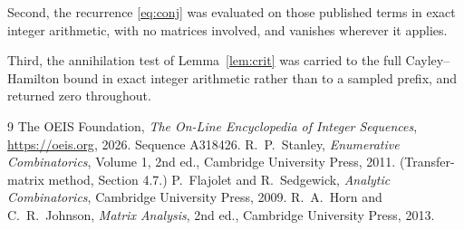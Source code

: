 \documentclass[11pt,a4paper]{article}
\theoremstyle{plain}
\theoremstyle{definition}
\begin{document}
Second, the recurrence \eqref{eq:conj} was evaluated on those published terms in exact
integer arithmetic, with no matrices involved, and vanishes wherever it applies.

Third, the annihilation test of Lemma~\ref{lem:crit} was carried to the full
Cayley--Hamilton bound in exact integer arithmetic rather than to a sampled prefix, and
returned zero throughout.

\begin{thebibliography}{9}
 The OEIS Foundation, \emph{The On-Line Encyclopedia of Integer
Sequences}, \url{https://oeis.org}, 2026. Sequence A318426.
 R.~P.~Stanley, \emph{Enumerative Combinatorics}, Volume 1, 2nd ed.,
Cambridge University Press, 2011. (Transfer-matrix method, Section 4.7.)
 P.~Flajolet and R.~Sedgewick, \emph{Analytic Combinatorics}, Cambridge
University Press, 2009.
 R.~A.~Horn and C.~R.~Johnson, \emph{Matrix Analysis}, 2nd ed., Cambridge
University Press, 2013.
\end{thebibliography}
\end{document}
